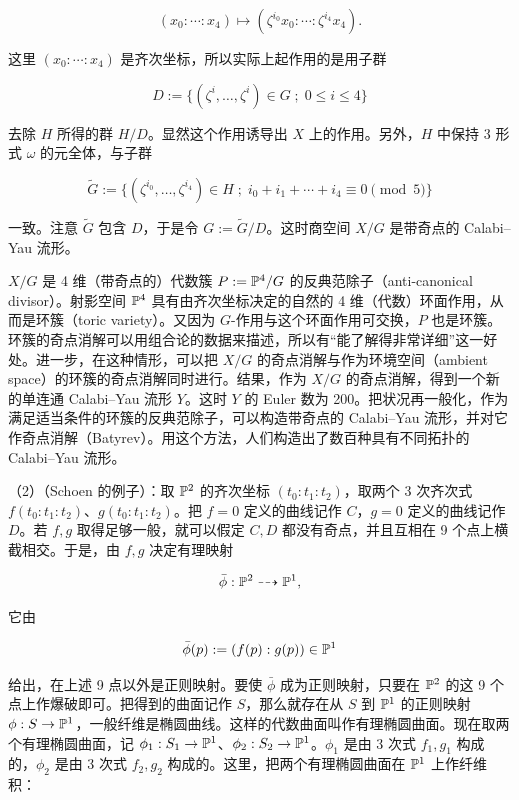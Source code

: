 \[
  (x_0 : \cdots : x_4) \longmapsto (\zeta^{i_0}x_0 : \cdots : \zeta^{i_4}x_4) .
\]

这里 $(x_0:\cdots:x_4)$ 是齐次坐标，所以实际上起作用的是用子群

\[
  D := \{(\zeta^i,\dots,\zeta^i) \in G \;;\; 0 \le i \le 4\}
\]


去除 $H$ 所得的群 $H/D$。显然这个作用诱导出 $X$ 上的作用。另外，$H$ 中保持 3 形式 $\omega$ 的元全体，与子群

\[
  \widetilde{G} := \{(\zeta^{i_0},\dots,\zeta^{i_4}) \in H \;;\;
  i_0+i_1+\cdots+i_4 \equiv 0 \pmod 5\}
\]

一致。注意 $\widetilde{G}$ 包含 $D$，于是令 $G := \widetilde{G}/D$。这时商空间 $X/G$ 是带奇点的 Calabi--Yau 流形。

$X/G$ 是 4 维（带奇点的）代数簇 $P := \mathbb{P}^4/G$ 的反典范除子（anti-canonical divisor）。射影空间 $\mathbb{P}^4$ 具有由齐次坐标决定的自然的 4 维（代数）环面作用，从而是环簇（toric variety）。又因为 $G$-作用与这个环面作用可交换，$P$ 也是环簇。环簇的奇点消解可以用组合论的数据来描述，所以有“能了解得非常详细”这一好处。进一步，在这种情形，可以把 $X/G$ 的奇点消解与作为环境空间（ambient space）的环簇的奇点消解同时进行。结果，作为 $X/G$ 的奇点消解，得到一个新的单连通 Calabi--Yau 流形 $Y$。这时 $Y$ 的 Euler 数为 200。把状况再一般化，作为满足适当条件的环簇的反典范除子，可以构造带奇点的 Calabi--Yau 流形，并对它作奇点消解（Batyrev）。用这个方法，人们构造出了数百种具有不同拓扑的 Calabi--Yau 流形。

（2）（Schoen 的例子）：取 $\mathbb{P}^2$ 的齐次坐标 $(t_0:t_1:t_2)$，取两个 3 次齐次式 $f(t_0:t_1:t_2)$、$g(t_0:t_1:t_2)$。把 $f=0$ 定义的曲线记作 $C$，$g=0$ 定义的曲线记作 $D$。若 $f,g$ 取得足够一般，就可以假定 $C,D$ 都没有奇点，并且互相在 9 个点上横截相交。于是，由 $f,g$ 决定有理映射

\[
  \bar{\phi} : \mathbb{P}^2 \dashrightarrow \mathbb{P}^1 ,
\]

它由

\[
  \bar{\phi}(p) := (f(p) : g(p)) \in \mathbb{P}^1
\]

给出，在上述 9 点以外是正则映射。要使 $\bar{\phi}$ 成为正则映射，只要在 $\mathbb{P}^2$ 的这 9 个点上作爆破即可。把得到的曲面记作 $S$，那么就存在从 $S$ 到 $\mathbb{P}^1$ 的正则映射 $\phi : S \to \mathbb{P}^1$，一般纤维是椭圆曲线。这样的代数曲面叫作有理椭圆曲面。现在取两个有理椭圆曲面，记 $\phi_1 : S_1 \to \mathbb{P}^1$、$\phi_2 : S_2 \to \mathbb{P}^1$。$\phi_1$ 是由 3 次式 $f_1, g_1$ 构成的，$\phi_2$ 是由 3 次式 $f_2, g_2$ 构成的。这里，把两个有理椭圆曲面在 $\mathbb{P}^1$ 上作纤维积：

